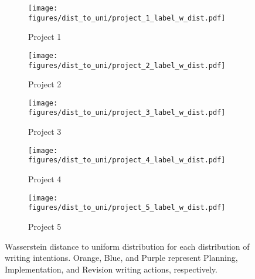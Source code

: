 \begin{figure*}
    \centering
    \begin{subfigure}{0.32\textwidth}
        \texttt{[image: figures/dist\_to\_uni/project\_1\_label\_w\_dist.pdf]}
        \caption{Project 1}
    \end{subfigure}
    \begin{subfigure}{0.32\textwidth}
        \texttt{[image: figures/dist\_to\_uni/project\_2\_label\_w\_dist.pdf]}
        \caption{Project 2}
    \end{subfigure}
    \begin{subfigure}{0.32\textwidth}
        \texttt{[image: figures/dist\_to\_uni/project\_3\_label\_w\_dist.pdf]}
        \caption{Project 3}
    \end{subfigure}
    \begin{subfigure}{0.32\textwidth}
        \texttt{[image: figures/dist\_to\_uni/project\_4\_label\_w\_dist.pdf]}
        \caption{Project 4}
    \end{subfigure}
    \begin{subfigure}{0.32\textwidth}
        \texttt{[image: figures/dist\_to\_uni/project\_5\_label\_w\_dist.pdf]}
        \caption{Project 5}
    \end{subfigure}
    \caption{Wasserstein distance to uniform distribution for each distribution of writing intentions. Orange, Blue, and Purple represent Planning, Implementation, and Revision writing actions, respectively.}
    \label{fig:dist-to-uni-all}
\end{figure*}

